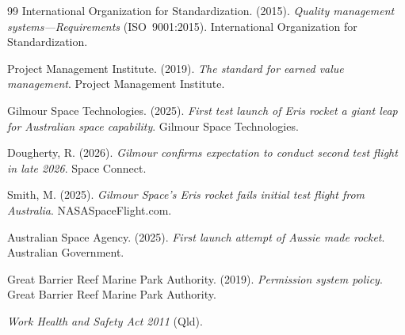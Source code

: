 \documentclass[12pt,a4paper]{article}
\numberwithin{table}{section}
\numberwithin{figure}{section}
\begin{document}
\begin{thebibliography}{99}
International Organization for Standardization. (2015). \textit{Quality management systems---Requirements} (ISO~9001:2015). International Organization for Standardization.

Project Management Institute. (2019). \textit{The standard for earned value management}. Project Management Institute.

Gilmour Space Technologies. (2025). \textit{First test launch of Eris rocket a giant leap for Australian space capability}. Gilmour Space Technologies.

Dougherty, R. (2026). \textit{Gilmour confirms expectation to conduct second test flight in late 2026}. Space Connect.

Smith, M. (2025). \textit{Gilmour Space's Eris rocket fails initial test flight from Australia}. NASASpaceFlight.com.

Australian Space Agency. (2025). \textit{First launch attempt of Aussie made rocket}. Australian Government.

Great Barrier Reef Marine Park Authority. (2019). \textit{Permission system policy}. Great Barrier Reef Marine Park Authority.

\textit{Work Health and Safety Act 2011} (Qld).
\end{thebibliography}


\end{document}
